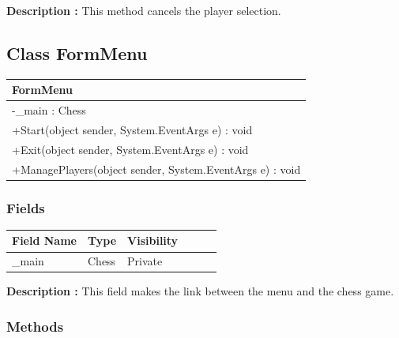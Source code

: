 \documentclass[12pt]{article}
\begin{document}
\textbf{Description :} This method cancels the player selection.

\newpage


\subsection{Class FormMenu}

\begin{table}[H]
    \begin{tabular}{|l|}
    \hline
    \rowcolor[HTML]{C0C0C0} 
    \textbf{FormMenu}                                   \\ \hline
    \rowcolor[HTML]{EFEFEF} 
    -\_main : Chess                                          \\ \hline
    \rowcolor[HTML]{FFFFFF} 
    +Start(object sender, System.EventArgs e) : void         \\ \hline
    \rowcolor[HTML]{FFFFFF} 
    +Exit(object sender, System.EventArgs e) : void          \\ \hline
    \rowcolor[HTML]{FFFFFF} 
    +ManagePlayers(object sender, System.EventArgs e) : void \\ \hline
    \end{tabular}
\end{table}

\subsubsection{Fields}

\begin{table}[H]
    \begin{tabular}{llllll}
    \hline
    \multicolumn{1}{|l|}{\cellcolor[HTML]{EFEFEF}\textbf{Field Name}} & \multicolumn{1}{l|}{\cellcolor[HTML]{EFEFEF}\textbf{Type}} & \multicolumn{1}{l|}{\cellcolor[HTML]{EFEFEF}\textbf{Visibility}} \\ \hline
    \multicolumn{1}{|l|}{\_main}                                      & \multicolumn{1}{l|}{Chess}                                & \multicolumn{1}{l|}{Private}                                     \\ \hline
    \end{tabular}
\end{table}

\textbf{Description :} This field makes the link between the menu and the chess game.

\subsubsection{Methods}
\end{document}
